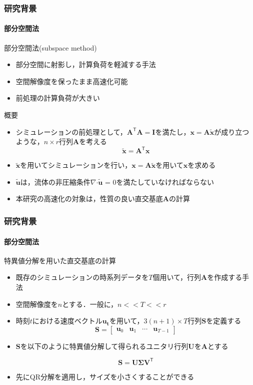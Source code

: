 \documentclass[aspectratio=169,dvipdfmx,hyperref={bookmarks=true}]{beamer}
\begin{document}
   \begin{frame}
  \frametitle{研究背景}
      \framesubtitle{部分空間法}
\begin{block}{部分空間法(subspace method)}
\begin{itemize}
\item 部分空間に射影し，計算負荷を軽減する手法
\item 空間解像度を保ったまま高速化可能
\item 前処理の計算負荷が大きい
\end{itemize}
\end{block}

\begin{block}{概要}
\begin{itemize}
 \item シミュレーションの前処理として，$\bm{A}^{\mathsf T} \bm{A} = \bm{I}$を満たし，$\bm{x} = \bm{A}\bm{\widetilde{x}} $が成り立つような，$n \times r$行列$\bm{A}$を考える
 \[
 \bm{\widetilde{x}} = \bm{A}^{\mathsf T}\bm{x}
 \]
\item $\bm{\widetilde{x}}$を用いてシミュレーションを行い，$\bm{x} = \bm{A}\bm{\widetilde{x}}$を用いて$\bm{x}$を求める
\item $\bm{\widetilde{u}}$は，流体の非圧縮条件$\nabla\boldsymbol{\cdot}\bm{\widetilde{u}}$ = 0を満たしていなければならない
\item 本研究の高速化の対象は，性質の良い直交基底$\bm{A}$の計算
\end{itemize}
\end{block}
 \end{frame}

   \begin{frame}
  \frametitle{研究背景}
    \framesubtitle{部分空間法}
   \begin{block}{特異値分解を用いた直交基底の計算}
   \begin{itemize}
   \item 既存のシミュレーションの時系列データを$T$個用いて，行列$\bm{A}$を作成する手法
\item 空間解像度を$n$とする．一般に，$n <\!< T <\!< r$ 
\item 時刻$t$における速度ベクトル$\bm{u_t}$を用いて，$3(n+1)\times T$行列$\bm{S}$を定義する
	 \[ \bm{S} = 
        		\begin{bmatrix}
   \bm{u}_0 & \bm{u}_1 &\cdots  & \bm{u}_{T-1}
\end{bmatrix}
\]
\item $\bm{S}$を以下のように特異値分解して得られるユニタリ行列$\bm{U}$を$\bm{A}$とする

\[
\bm{S} = \bm{U} \bm{\Sigma} \bm{V}^{\mathsf T}
\]

\item 先にQR分解を適用し，サイズを小さくすることができる
\end{itemize}
\end{block}

 \end{frame}
 
\end{document}
